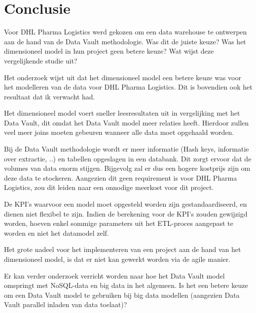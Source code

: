 
\chapter{Conclusie}
\label{ch:conclusie}


Voor DHL Pharma Logistics werd gekozen om een data warehouse te ontwerpen aan de hand van de Data Vault methodologie. Was dit de juiste keuze? Was het dimensioneel model in hun project geen betere keuze? Wat wijst deze vergelijkende studie uit?

Het onderzoek wijst uit dat het dimensioneel model een betere keuze was voor het modelleren van de data voor DHL Pharma Logistics. Dit is bovendien ook het resultaat dat ik verwacht had.

Het dimensioneel model voert sneller leesresultaten uit in vergelijking met het Data Vault, dit omdat het Data Vault model meer relaties heeft. Hierdoor zullen veel meer joins moeten gebeuren wanneer alle data moet opgehaald worden. 

Bij de Data Vault methodologie wordt er meer informatie (Hash keys, informatie over extractie, ..) en tabellen opgeslagen in een databank. Dit zorgt ervoor dat de volumes van data enorm stijgen. Bijgevolg zal er dus een hogere kostprijs zijn om deze data te stockeren. Aangezien dit geen requirement is voor DHL Pharma Logistics, zou dit leiden naar een onnodige meerkost voor dit project.

De KPI's waarvoor een model moet opgesteld worden zijn gestandaardiseerd, en dienen niet flexibel te zijn. Indien de berekening voor de KPI's zouden gewijzigd worden, hoeven enkel sommige parameters uit het ETL-proces aangepast te worden en niet het datamodel zelf.

Het grote nadeel voor het implementeren van een project aan de hand van het dimensioneel model, is dat er niet kan gewerkt worden via de agile manier.

Er kan verder onderzoek verricht worden naar hoe het Data Vault model omspringt met NoSQL-data en big data in het algemeen. Is het een betere keuze om een Data Vault model te gebruiken bij big data modellen (aangezien Data Vault parallel inladen van data toelaat)? 